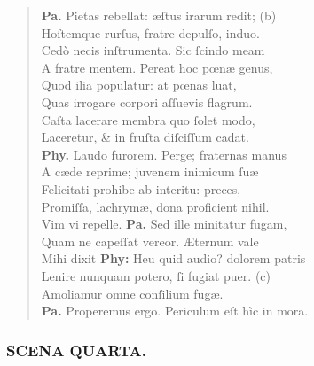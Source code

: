 \documentclass[a4paper,12pt]{article}
\begin{document}
\begin{verse}
\textbf{Pa.} Pietas rebellat: æſtus irarum redit; (b)\footnotemark\\[0pt]
Hoſtemque rurſus, fratre depulſo, induo.\\[0pt]
Cedò necis inſtrumenta. Sic ſcindo meam\\[0pt]
A fratre mentem. Pereat hoc pœnæ genus,\\[0pt]
Quod ilia populatur: at pœnas luat,\\[0pt]
Quas irrogare corpori aſſuevis flagrum.\\[0pt]
Caſta lacerare membra quo ſolet modo,\\[0pt]
Laceretur, \& in fruſta diſciſſum cadat.\\[0pt]
\textbf{Phy.} Laudo furorem. Perge; fraternas manus\\[0pt]
A cæde reprime; juvenem inimicum ſuæ\\[0pt]
Felicitati prohibe ab interitu: preces,\\[0pt]
Promiſſa, lachrymæ, dona proficient nihil.\\[0pt]
Vim vi repelle. \textbf{Pa.} Sed ille minitatur fugam,\\[0pt]
Quam ne capeſſat vereor. Æternum vale\\[0pt]
Mihi dixit \textbf{Phy:} Heu quid audio? dolorem patris\\[0pt]
Lenire nunquam potero, ſi fugiat puer. (c)\footnotemark\\[0pt]
Amoliamur omne conſilium fugæ.\\[0pt]
\textbf{Pa.} Properemus ergo. Periculum eſt hìc in mora.\\[0pt]
\end{verse}
\subsubsection{SCENA QUARTA.}
\label{sec:orgd1a389e}
\end{document}
